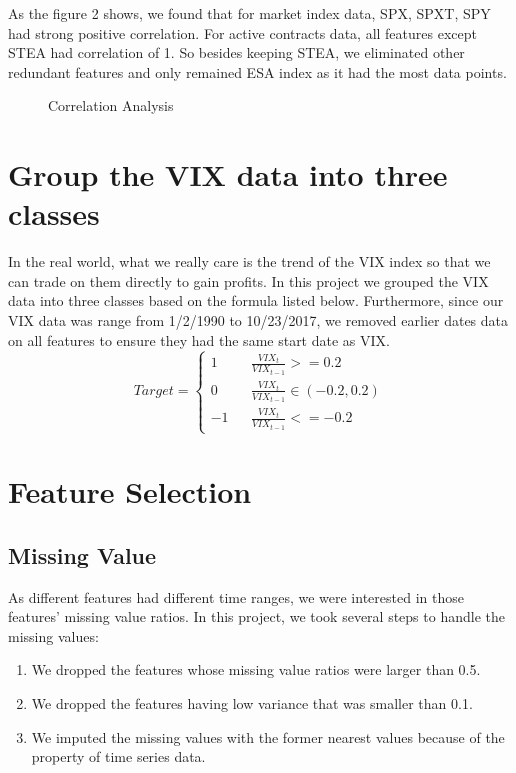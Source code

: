 \documentclass{article}
\begin{document}
As the figure 2 shows, we found that for market index data, SPX, SPXT, SPY had strong positive correlation. For active contracts data, all features except STEA had correlation of 1. So besides keeping STEA, we eliminated other redundant features and only remained ESA index as it had the most data points.

\begin{figure}[h]
\begin{center}
\caption{Correlation Analysis}
\end{center}
\end{figure}

\section*{Group the VIX data into three classes}
In the real world, what we really care is the trend of the VIX index so that we can trade on them directly to gain profits. In this project we grouped the VIX data into three classes based on the formula listed below. Furthermore, since our VIX data was range from 1/2/1990 to 10/23/2017, we removed earlier dates data on all features to ensure they had the same start date as VIX.
$$
Target = \left\{
\begin{array}{rcl}
1 && \frac{VIX_t}{VIX_{t-1}} >= 0.2\\
0 && \frac{VIX_t}{VIX_{t-1}} \in (-0.2,0.2)\\ 
-1 && \frac{VIX_t}{VIX_{t-1}} <= -0.2
\end{array}
\right.
$$

\section*{Feature Selection}
\subsection*{Missing Value}
As different features had different time ranges, we were interested in those features' missing value ratios. In this project, we took several steps to handle the missing values:
\begin{enumerate}
\itemsep0em
\item We dropped the features whose missing value ratios were larger than 0.5.
\item We dropped the features having low variance that was smaller than 0.1.
\item We imputed the missing values with the former nearest values because of the property of time series data.
\end{enumerate}
\end{document}
